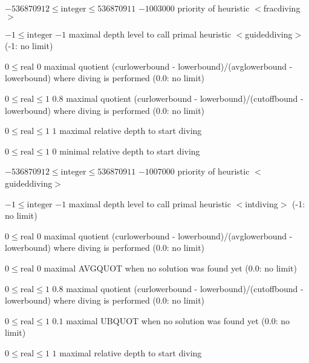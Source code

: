 %
{$-536870912\leq\textrm{integer}\leq536870911$}%
{$-1003000$}%
{priority of heuristic $<$fracdiving$>$}%
{}

%
{$-1\leq\textrm{integer}$}%
{$-1$}%
{maximal depth level to call primal heuristic $<$guideddiving$>$ (-1: no limit)}%
{}

%
{$0\leq\textrm{real}$}%
{$0$}%
{maximal quotient (curlowerbound - lowerbound)/(avglowerbound - lowerbound) where diving is performed (0.0: no limit)}%
{}

%
{$0\leq\textrm{real}\leq1$}%
{$0.8$}%
{maximal quotient (curlowerbound - lowerbound)/(cutoffbound - lowerbound) where diving is performed (0.0: no limit)}%
{}

%
{$0\leq\textrm{real}\leq1$}%
{$1$}%
{maximal relative depth to start diving}%
{}

%
{$0\leq\textrm{real}\leq1$}%
{$0$}%
{minimal relative depth to start diving}%
{}

%
{$-536870912\leq\textrm{integer}\leq536870911$}%
{$-1007000$}%
{priority of heuristic $<$guideddiving$>$}%
{}

%
{$-1\leq\textrm{integer}$}%
{$-1$}%
{maximal depth level to call primal heuristic $<$intdiving$>$ (-1: no limit)}%
{}

%
{$0\leq\textrm{real}$}%
{$0$}%
{maximal quotient (curlowerbound - lowerbound)/(avglowerbound - lowerbound) where diving is performed (0.0: no limit)}%
{}

%
{$0\leq\textrm{real}$}%
{$0$}%
{maximal AVGQUOT when no solution was found yet (0.0: no limit)}%
{}

%
{$0\leq\textrm{real}\leq1$}%
{$0.8$}%
{maximal quotient (curlowerbound - lowerbound)/(cutoffbound - lowerbound) where diving is performed (0.0: no limit)}%
{}

%
{$0\leq\textrm{real}\leq1$}%
{$0.1$}%
{maximal UBQUOT when no solution was found yet (0.0: no limit)}%
{}

%
{$0\leq\textrm{real}\leq1$}%
{$1$}%
{maximal relative depth to start diving}%
{}

